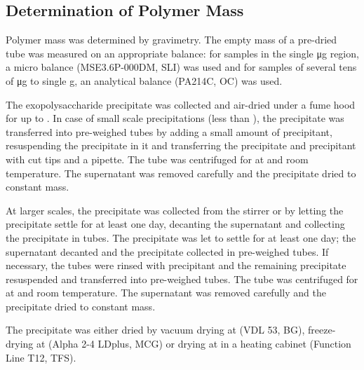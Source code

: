 \subsection{Determination of Polymer Mass}
Polymer mass was determined by gravimetry. The empty mass of a pre-dried tube was measured on an appropriate balance: for samples in the single \si{\micro\gram} region, a micro balance (MSE3.6P-000DM, SLI) was used and for samples of several tens of \si{\micro\gram} to single \si{\gram}, an analytical balance (PA214C, OC) was used.

The exopolysaccharide precipitate was collected and air-dried under a fume hood for up to . In case of small scale precipitations (less than ), the precipitate was transferred into pre-weighed  tubes by adding a small amount of precipitant, resuspending the precipitate in it and transferring the precipitate and precipitant with cut  tips and a pipette. The tube was centrifuged for  at  and room temperature. %
The supernatant was removed carefully and the precipitate dried to constant mass.

At larger scales, the precipitate was collected from the stirrer or by letting the precipitate settle for at least one day, decanting the supernatant and collecting the precipitate in  tubes. The precipitate was let to settle for at least one day; the supernatant decanted and the precipitate collected in pre-weighed  tubes. If necessary, the  tubes were rinsed with precipitant and the remaining precipitate resuspended and transferred into pre-weighed  tubes. The tube was centrifuged for  at  and room temperature. %
The supernatant was removed carefully and the precipitate dried to constant mass.

The precipitate was either dried by vacuum drying at  (VDL 53, BG), %
freeze-drying at  (Alpha 2-4 LDplus, MCG) or %
drying at  in a heating cabinet (Function Line T12, TFS). %

